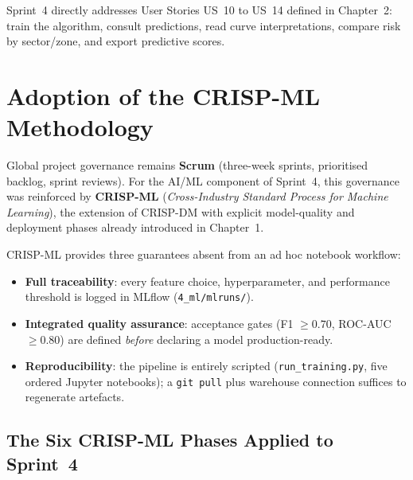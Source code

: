 Sprint~4 directly addresses User Stories US~10 to US~14 defined in
Chapter~2: train the algorithm, consult predictions, read curve interpretations,
compare risk by sector/zone, and export predictive scores.

\section{Adoption of the CRISP-ML Methodology}
\label{sec:crispml_adoption}

Global project governance remains \textbf{Scrum} (three-week sprints, prioritised
backlog, sprint reviews). For the AI/ML component of Sprint~4, this governance was
reinforced by \textbf{CRISP-ML} (\textit{Cross-Industry Standard Process for Machine
Learning}), the extension of CRISP-DM with explicit model-quality and deployment
phases already introduced in Chapter~1.

CRISP-ML provides three guarantees absent from an ad hoc notebook workflow:
\begin{itemize}
    \item \textbf{Full traceability}: every feature choice, hyperparameter, and
          performance threshold is logged in MLflow (\texttt{4\_ml/mlruns/}).
    \item \textbf{Integrated quality assurance}: acceptance gates (F1 $\geq 0.70$,
          ROC-AUC $\geq 0.80$) are defined \emph{before} declaring a model
          production-ready.
    \item \textbf{Reproducibility}: the pipeline is entirely scripted
          (\texttt{run\_training.py}, five ordered Jupyter notebooks); a
          \texttt{git pull} plus warehouse connection suffices to regenerate
          artefacts.
\end{itemize}

\subsection{The Six CRISP-ML Phases Applied to Sprint~4}

